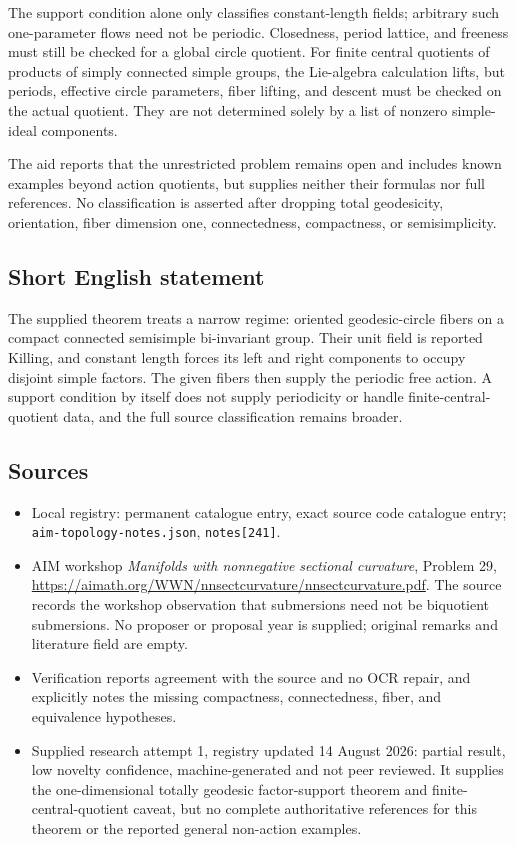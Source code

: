 \documentclass[11pt]{article}
\begin{document}
The support condition alone only classifies constant-length fields; arbitrary such one-parameter flows need not be periodic. Closedness, period lattice, and freeness must still be checked for a global circle quotient. For finite central quotients of products of simply connected simple groups, the Lie-algebra calculation lifts, but periods, effective circle parameters, fiber lifting, and descent must be checked on the actual quotient. They are not determined solely by a list of nonzero simple-ideal components.

The aid reports that the unrestricted problem remains open and includes known examples beyond action quotients, but supplies neither their formulas nor full references. No classification is asserted after dropping total geodesicity, orientation, fiber dimension one, connectedness, compactness, or semisimplicity.
\subsection{Short English statement}
The supplied theorem treats a narrow regime: oriented geodesic-circle fibers on a compact connected semisimple bi-invariant group. Their unit field is reported Killing, and constant length forces its left and right components to occupy disjoint simple factors. The given fibers then supply the periodic free action. A support condition by itself does not supply periodicity or handle finite-central-quotient data, and the full source classification remains broader.
\subsection{Sources}
\begin{itemize}
\item Local registry: permanent catalogue entry, exact source code catalogue entry; \texttt{aim-topology-notes.json}, \texttt{notes[241]}.
\item AIM workshop \emph{Manifolds with nonnegative sectional curvature}, Problem 29, \url{https://aimath.org/WWN/nnsectcurvature/nnsectcurvature.pdf}. The source records the workshop observation that submersions need not be biquotient submersions. No proposer or proposal year is supplied; original remarks and literature field are empty.
\item Verification reports agreement with the source and no OCR repair, and explicitly notes the missing compactness, connectedness, fiber, and equivalence hypotheses.
\item Supplied research attempt 1, registry updated 14 August 2026: partial result, low novelty confidence, machine-generated and not peer reviewed. It supplies the one-dimensional totally geodesic factor-support theorem and finite-central-quotient caveat, but no complete authoritative references for this theorem or the reported general non-action examples.
\end{itemize}
\end{document}
